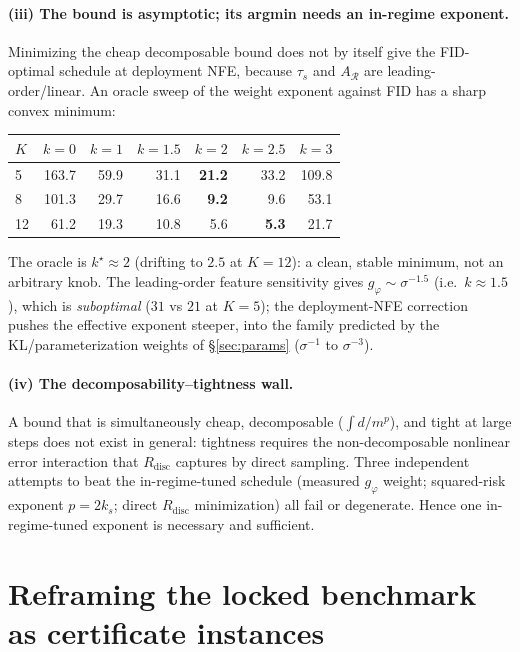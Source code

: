 \documentclass[11pt]{article}
\newcommand{\R}{\mathcal R}
\begin{document}
\paragraph{(iii) The bound is asymptotic; its argmin needs an in-regime
exponent.} Minimizing the cheap decomposable bound does not by itself give
the FID-optimal schedule at deployment NFE, because $\tau_s$ and $A_\R$
are leading-order/linear. An oracle sweep of the weight exponent against
FID has a sharp convex minimum:
\begin{center}
\small
\begin{tabular}{l rrrrrr}
\toprule
$K$ & $k{=}0$ & $k{=}1$ & $k{=}1.5$ & $k{=}2$ & $k{=}2.5$ & $k{=}3$ \\
\midrule
5 & 163.7 & 59.9 & 31.1 & \textbf{21.2} & 33.2 & 109.8 \\
8 & 101.3 & 29.7 & 16.6 & \textbf{9.2} & 9.6 & 53.1 \\
12 & 61.2 & 19.3 & 10.8 & 5.6 & \textbf{5.3} & 21.7 \\
\bottomrule
\end{tabular}
\end{center}
The oracle is $k^\star\approx 2$ (drifting to $2.5$ at $K{=}12$): a clean,
stable minimum, not an arbitrary knob. The leading-order feature
sensitivity gives $g_\varphi\sim\sigma^{-1.5}$ (i.e.\ $k\approx1.5$), which
is \emph{suboptimal} ($31$ vs $21$ at $K{=}5$); the deployment-NFE
correction pushes the effective exponent steeper, into the family
predicted by the KL/parameterization weights of \S\ref{sec:params}
($\sigma^{-1}$ to $\sigma^{-3}$).

\paragraph{(iv) The decomposability--tightness wall.} A bound that is
simultaneously cheap, decomposable ($\int d/m^p$), and tight at large
steps does not exist in general: tightness requires the non-decomposable
nonlinear error interaction that $R_{\mathrm{disc}}$ captures by direct
sampling. Three independent attempts to beat the in-regime-tuned schedule
(measured $g_\varphi$ weight; squared-risk exponent $p=2k_s$; direct
$R_{\mathrm{disc}}$ minimization) all fail or degenerate. Hence one
in-regime-tuned exponent is necessary and sufficient.

\section{Reframing the locked benchmark as certificate instances}
\label{sec:reframe}
\end{document}
